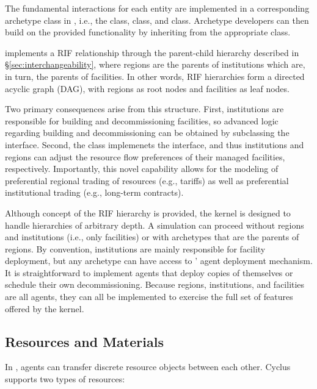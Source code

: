 The fundamental interactions for each entity are implemented in a corresponding
archetype class in \Cyclus, i.e., the  class, 
class, and  class. Archetype developers can then build on the
provided functionality by inheriting from the appropriate class.

\Cyclus implements a \gls{RIF} relationship through the
parent-child hierarchy described in \S \ref{sec:interchangeability}, where
regions are the parents of institutions which are, in turn, the parents of
facilities. In other words, \gls{RIF} hierarchies form a directed acyclic graph (DAG),
with regions as root nodes and facilities as leaf nodes.

Two primary consequences arise from this structure. First, institutions are
responsible for building and decommissioning facilities, so advanced
logic regarding building and decommissioning can be obtained by subclassing the
 interface. Second, the  class implemenets the
 interface, and thus institutions and regions can
adjust the resource flow preferences of their managed facilities, respectively. Importantly,
this novel capability allows for the modeling of preferential regional trading
of resources (e.g., tariffs) as well as preferential institutional trading
(e.g., long-term contracts).

Although concept of the \gls{RIF} hierarchy is provided, the \Cyclus kernel is
designed to handle hierarchies of arbitrary depth.
A simulation can proceed without regions and institutions (i.e.,  only facilities)
or with archetypes that are the parents of regions.  By
convention, institutions are mainly responsible for facility deployment, but
any archetype can have access to \Cyclus' agent deployment mechanism.  It is straightforward
to implement agents that deploy copies of themselves or schedule their
own decommissioning.  Because regions, institutions, and facilities are all
agents, they can all be implemented to exercise the full set of features
offered by the \Cyclus kernel.

\subsection{Resources and Materials}


In \Cyclus, agents can transfer discrete resource objects between each other.
Cyclus supports two types of resources:

